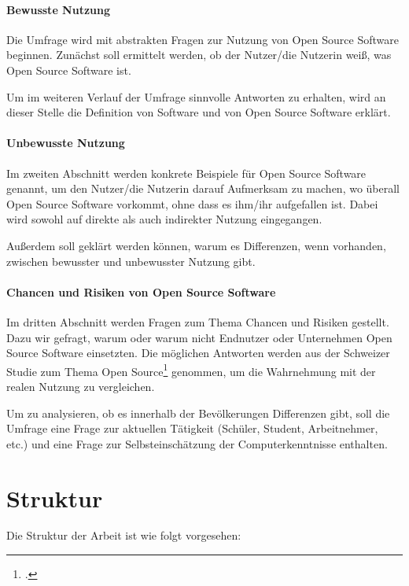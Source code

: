 \documentclass[a4paper]{article}
\begin{document}
	   \paragraph{Bewusste Nutzung}
	       Die Umfrage wird mit abstrakten Fragen zur Nutzung von Open Source Software beginnen. Zunächst soll ermittelt werden, ob der Nutzer/die Nutzerin weiß, was Open Source Software ist.
	       
	       Um im weiteren Verlauf der Umfrage sinnvolle Antworten zu erhalten, wird an dieser Stelle die Definition von Software und von Open Source Software erklärt.
	 
	   
	   \paragraph{Unbewusste Nutzung}
	       Im zweiten Abschnitt werden konkrete Beispiele für Open Source Software genannt, um den Nutzer/die Nutzerin  darauf Aufmerksam zu machen, wo überall Open Source Software vorkommt, ohne dass es ihm/ihr aufgefallen ist. Dabei wird sowohl auf direkte als auch indirekter Nutzung eingegangen.
	       
	       Außerdem soll geklärt werden können, warum es Differenzen, wenn vorhanden, zwischen bewusster und unbewusster Nutzung gibt.
	       
	   \paragraph{Chancen und Risiken von Open Source Software}
	       Im dritten Abschnitt werden Fragen zum Thema Chancen und Risiken gestellt. Dazu wir gefragt, warum oder warum nicht Endnutzer oder Unternehmen Open Source Software einsetzten. Die möglichen Antworten werden aus der Schweizer Studie zum Thema Open Source\footcite{oss:studie} genommen, um die Wahrnehmung mit der realen Nutzung zu vergleichen.
	   \\\par
	   Um zu analysieren, ob es innerhalb der Bevölkerungen Differenzen gibt, soll die Umfrage eine Frage zur aktuellen Tätigkeit (Schüler, Student, Arbeitnehmer, etc.) und eine Frage zur Selbsteinschätzung der Computerkenntnisse enthalten.
	   
	   
	\section{Struktur}
	   Die Struktur der Arbeit ist wie folgt vorgesehen:
	
\end{document}
